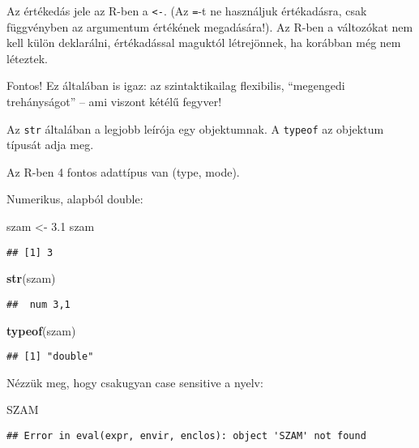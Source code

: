 \documentclass[]{book}
\newenvironment{Shaded}{\begin{snugshade}}{\end{snugshade}}
\newcommand{\KeywordTok}[1]{\textcolor[rgb]{0.13,0.29,0.53}{\textbf{#1}}}
\newcommand{\FloatTok}[1]{\textcolor[rgb]{0.00,0.00,0.81}{#1}}
\newcommand{\StringTok}[1]{\textcolor[rgb]{0.31,0.60,0.02}{#1}}
\newcommand{\NormalTok}[1]{#1}
\begin{document}
Az értékedás jele az R-ben a \texttt{\textless{}-}. (Az \texttt{=}-t ne
használjuk értékadásra, csak függvényben az argumentum értékének
megadására!). Az R-ben a változókat nem kell külön deklarálni,
értékadással maguktól létrejönnek, ha korábban még nem léteztek.

Fontos! Ez általában is igaz: az szintaktikailag flexibilis, ``megengedi
trehányságot'' -- ami viszont kétélű fegyver!

Az \texttt{str} általában a legjobb leírója egy objektumnak. A
\texttt{typeof} az objektum típusát adja meg.

Az R-ben 4 fontos adattípus van (type, mode).

Numerikus, alapból double:

\begin{Shaded}
\begin{Highlighting}[]
\NormalTok{szam <-}\StringTok{ }\FloatTok{3.1}
\NormalTok{szam}
\end{Highlighting}
\end{Shaded}

\begin{verbatim}
## [1] 3
\end{verbatim}

\begin{Shaded}
\begin{Highlighting}[]
\KeywordTok{str}\NormalTok{(szam)}
\end{Highlighting}
\end{Shaded}

\begin{verbatim}
##  num 3,1
\end{verbatim}

\begin{Shaded}
\begin{Highlighting}[]
\KeywordTok{typeof}\NormalTok{(szam)}
\end{Highlighting}
\end{Shaded}

\begin{verbatim}
## [1] "double"
\end{verbatim}

Nézzük meg, hogy csakugyan case sensitive a nyelv:

\begin{Shaded}
\begin{Highlighting}[]
\NormalTok{SZAM}
\end{Highlighting}
\end{Shaded}

\begin{verbatim}
## Error in eval(expr, envir, enclos): object 'SZAM' not found
\end{verbatim}
\end{document}

